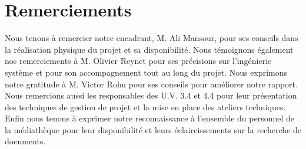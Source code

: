 \section*{Remerciements}

Nous tenons à remercier notre encadrant, M. Ali Mansour, pour ses conseils dans la réalisation physique du projet et sa disponibilité.
\bigbreak
Nous témoignons également nos remerciements à M. Olivier Reynet pour ses précisions sur l’ingénierie système et pour son accompagnement tout au long du projet.
\bigbreak
Nous exprimons notre gratitude à M. Victor Rohu pour ses conseils pour améliorer notre rapport. 
\bigbreak
Nous remercions aussi les responsables des U.V. 3.4 et 4.4 pour leur présentation des techniques de gestion de projet et la mise en place des ateliers techniques.
\bigbreak
Enfin nous tenons à exprimer notre reconnaissance à l’ensemble du personnel de la médiathèque pour leur disponibilité et leurs éclaircissements sur la recherche de documents.
